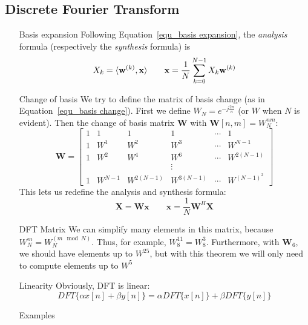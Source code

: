\documentclass[11pt,a4paper]{article}
\begin{document}
\subsection{Discrete Fourier Transform}
\begin{itemize}
	\item[Basis expansion]Following Equation~\ref{equ_basis expansion}, the \textit{analysis} formula (respectively the \textit{synthesis} formula) is
	      \begin{equation}
		      X_k = \langle\mathbf{w}^{(k)},\mathbf{x}\rangle \qquad \mathbf{x} = \frac{1}{N} \somme{N-1}{k=0}X_k \mathbf{w}^{(k)}
	      \end{equation}
	\item[Change of basis]We try to define the matrix of basis change (as in Equation~\ref{equ_basis change}). First we define $W_N = e^{-j\frac{2\pi}{n}}$ (or $W$ when $N$ is evident). Then the change of basis matrix $\mathbf{W}$ with $\mathbf{W}[n,m] = W_N^{nm}$:
	      \begin{equation}
		      \mathbf{W} =
		      \begin{bmatrix}
			      1 & 1 & 1 & 1 & \cdots & 1
			      \\1 & W^1 & W^2 & W^3 & \cdots & W^{N-1}
			      \\1 & W^2 & W^4 & W^6 & \cdots & W^{2(N-1)}
			      \\& & & \vdots
			      \\1 & W^{N-1} & W^{2(N-1)} & W^{3(N-1)} & \cdots & W^{(N-1)^2}
		      \end{bmatrix}
	      \end{equation}
	      This lets us redefine the analysis and synthesis formula:
	      \begin{equation}
		      \mathbf{X} = \mathbf{W}\mathbf{x} \qquad \mathbf{x} =\frac{1}{N}\mathbf{W}^H \mathbf{X}
	      \end{equation}
	\item[DFT Matrix]We can simplify many elements in this matrix, because $W_N^m = W_N^{(m \mod N)}$. Thus, for example, $W^{11}_8 = W^3_8$. Furthermore, with $\mathbf{W}_6$, we should have elements up to $W^{25}$, but with this theorem we will only need to compute elements up to $W^5$
	\item[Linearity]Obviously, DFT is linear:
	      \begin{equation*}
		      DFT\{\alpha x[n] + \beta y[n]\} = \alpha DFT\{x[n]\} + \beta DFT\{y[n]\}
	      \end{equation*}
	\item[Examples]

\end{itemize}
\end{document}
